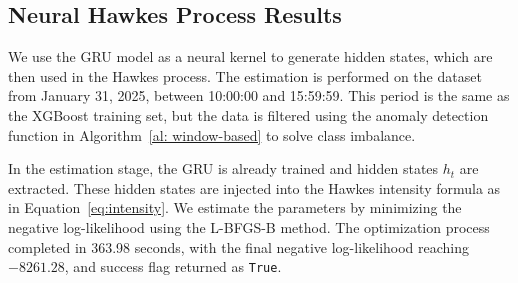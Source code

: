 \subsection{Neural Hawkes Process Results}
We use the GRU model as a neural kernel to generate hidden states, which are then used in the Hawkes process. The estimation is performed on the dataset from January 31, 2025, between 10:00:00 and 15:59:59. This period is the same as the XGBoost training set, but the data is filtered using the anomaly detection function in Algorithm~\ref{al: window-based} to solve class imbalance.

In the estimation stage, the GRU is already trained and hidden states \( h_t \) are extracted. These hidden states are injected into the Hawkes intensity formula as in Equation~\ref{eq:intensity}. We estimate the parameters by minimizing the negative log-likelihood using the L-BFGS-B method. The optimization process completed in 363.98 seconds, with the final negative log-likelihood reaching $-8261.28$, and success flag returned as \texttt{True}.

